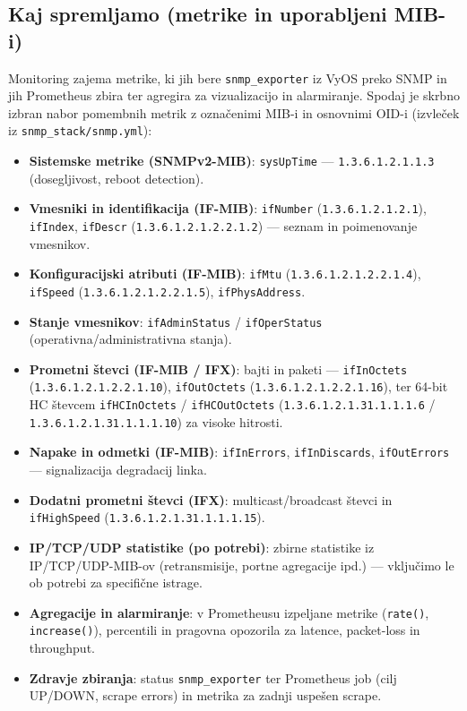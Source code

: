 \documentclass[a4paper,11pt]{article}
\begin{document}
\subsection{Kaj spremljamo (metrike in uporabljeni MIB-i)}
Monitoring zajema metrike, ki jih bere \texttt{snmp\_exporter} iz VyOS preko SNMP in jih Prometheus zbira ter agregira za vizualizacijo in alarmiranje. Spodaj je skrbno izbran nabor pomembnih metrik z označenimi MIB-i in osnovnimi OID-i (izvleček iz \texttt{snmp\_stack/snmp.yml}):
\begin{itemize}
  \item \textbf{Sistemske metrike (SNMPv2-MIB)}: \texttt{sysUpTime} — \texttt{1.3.6.1.2.1.1.3} (dosegljivost, reboot detection).
  \item \textbf{Vmesniki in identifikacija (IF-MIB)}: \texttt{ifNumber} (\texttt{1.3.6.1.2.1.2.1}), \texttt{ifIndex}, \texttt{ifDescr} (\texttt{1.3.6.1.2.1.2.2.1.2}) — seznam in poimenovanje vmesnikov.
  \item \textbf{Konfiguracijski atributi (IF-MIB)}: \texttt{ifMtu} (\texttt{1.3.6.1.2.1.2.2.1.4}), \\ \texttt{ifSpeed} (\texttt{1.3.6.1.2.1.2.2.1.5}), \texttt{ifPhysAddress}.
  \item \textbf{Stanje vmesnikov}: \texttt{ifAdminStatus} / \texttt{ifOperStatus} (operativna/administrativna stanja).
  \item \textbf{Prometni števci (IF-MIB / IFX)}: bajti in paketi — \texttt{ifInOctets} (\texttt{1.3.6.1.2.1.2.2.1.10}), \texttt{ifOutOctets} (\texttt{1.3.6.1.2.1.2.2.1.16}), ter 64-bit HC števcem \texttt{ifHCInOctets} / \texttt{ifHCOutOctets} (\texttt{1.3.6.1.2.1.31.1.1.1.6} / \texttt{1.3.6.1.2.1.31.1.1.1.10}) za visoke hitrosti.
  \item \textbf{Napake in odmetki (IF-MIB)}: \texttt{ifInErrors}, \texttt{ifInDiscards}, \texttt{ifOutErrors} — signalizacija degradacij linka.
  \item \textbf{Dodatni prometni števci (IFX)}: multicast/broadcast števci in \\ \texttt{ifHighSpeed} (\texttt{1.3.6.1.2.1.31.1.1.1.15}).
  \item \textbf{IP/TCP/UDP statistike (po potrebi)}: zbirne statistike iz IP/TCP/UDP-MIB-ov (retransmisije, portne agregacije ipd.) — vključimo le ob potrebi za specifične istrage.
  \item \textbf{Agregacije in alarmiranje}: v Prometheusu izpeljane metrike (\texttt{rate()}, \texttt{increase()}), percentili in pragovna opozorila za latence, packet-loss in throughput.
  \item \textbf{Zdravje zbiranja}: status \texttt{snmp\_exporter} ter Prometheus job (cilj UP/DOWN, scrape errors) in metrika za zadnji uspešen scrape.
\end{itemize}
\end{document}
